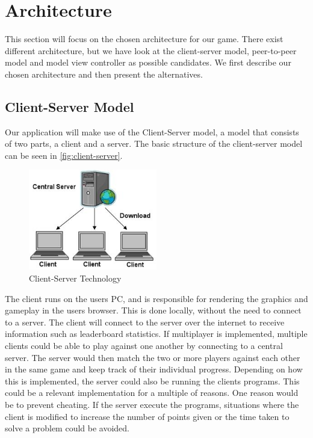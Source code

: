 \section{Architecture}

This section will focus on the chosen architecture for our game. There exist different architecture, but we have look at the client-server model, peer-to-peer model and model view controller as possible candidates. We first describe our chosen architecture and then present the alternatives.

\subsection{Client-Server Model}
Our application will make use of the Client-Server model, a model that consists of two parts, a client and a server. The basic structure of the client-server model can be seen in \autoref{fig:client-server}.

\begin{figure}[h]
  \centering
    \includegraphics[width=0.5\textwidth]{img/client_server.jpg}
  \caption{Client-Server Technology \citep{ClientServer}}
  \label{fig:client-server}
\end{figure}

The client runs on the users PC, and is responsible for rendering the graphics and gameplay in the users browser.
This is done locally, without the need to connect to a server. The client will connect to the server over the internet to receive information such as leaderboard statistics. If multiplayer is implemented, multiple clients could be able to play against one another by connecting to a central server. The server would then match the two or more players against each other in the same game and keep track of their individual progress. Depending on how this is implemented, the server could also be running the clients programs. This could be a relevant implementation for a multiple of reasons. One reason would be to prevent cheating. If the server execute the programs, situations where the client is modified to increase the number of points given or the time taken to solve a problem could be avoided.

